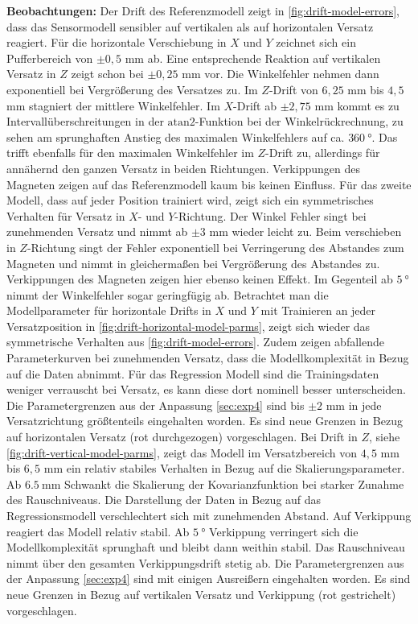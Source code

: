 \textbf{Beobachtungen:} Der Drift des Referenzmodell zeigt in \autoref{fig:drift-model-errors}, dass das Sensormodell sensibler auf vertikalen als auf horizontalen Versatz reagiert. Für die horizontale Verschiebung in $X$ und $Y$ zeichnet sich ein Pufferbereich von $\pm 0,5$ mm ab. Eine entsprechende Reaktion auf vertikalen Versatz in $Z$ zeigt schon bei $\pm 0,25$ mm vor. Die Winkelfehler nehmen dann exponentiell bei Vergrößerung des Versatzes zu. Im $Z$-Drift von $6,25$ mm bis $4,5$ mm stagniert der mittlere Winkelfehler. Im $X$-Drift ab $\pm 2,75$ mm kommt es zu Intervallüberschreitungen in der $\textrm{atan2}$-Funktion bei der Winkelrückrechnung, zu sehen am sprunghaften Anstieg des maximalen Winkelfehlers auf ca. $\SI{360}{\degree}$. Das trifft ebenfalls für den maximalen Winkelfehler im $Z$-Drift zu, allerdings für annähernd den ganzen Versatz in beiden Richtungen. Verkippungen des Magneten zeigen auf das Referenzmodell kaum bis keinen Einfluss.
\newline
Für das zweite Modell, dass auf jeder Position trainiert wird, zeigt sich ein symmetrisches Verhalten für Versatz in $X$- und $Y$-Richtung. Der Winkel Fehler singt bei zunehmenden Versatz und nimmt ab $\pm 3$ mm wieder leicht zu. Beim verschieben in $Z$-Richtung singt der Fehler exponentiell bei Verringerung des Abstandes zum Magneten und nimmt in gleichermaßen bei Vergrößerung des Abstandes zu. Verkippungen des Magneten zeigen hier ebenso keinen Effekt. Im Gegenteil ab $\SI{5}{\degree}$ nimmt der Winkelfehler sogar geringfügig ab.
\newline
Betrachtet man die Modellparameter für horizontale Drifts in $X$ und $Y$ mit Trainieren an jeder Versatzposition in \autoref{fig:drift-horizontal-model-parms}, zeigt sich wieder das symmetrische Verhalten aus \autoref{fig:drift-model-errors}. Zudem zeigen abfallende Parameterkurven bei zunehmenden Versatz, dass die Modellkomplexität in Bezug auf die Daten abnimmt. Für das Regression Modell sind die Trainingsdaten weniger verrauscht bei Versatz, es kann diese dort nominell besser unterscheiden. Die Parametergrenzen aus der Anpassung \autoref{sec:exp4} sind bis $\pm 2$ mm in jede Versatzrichtung größtenteils eingehalten worden. Es sind neue Grenzen in Bezug auf horizontalen Versatz (rot durchgezogen) vorgeschlagen.
\newline
Bei Drift in $Z$, siehe \autoref{fig:drift-vertical-model-parms}, zeigt das Modell im Versatzbereich von $4,5$ mm bis $6,5$ mm ein relativ stabiles Verhalten in Bezug auf die Skalierungsparameter. Ab $\SI{6,5}{\milli\metre}$ Schwankt die Skalierung der Kovarianzfunktion bei starker Zunahme des Rauschniveaus. Die Darstellung der Daten in Bezug auf das Regressionsmodell verschlechtert sich mit zunehmenden Abstand. Auf Verkippung reagiert das Modell relativ stabil. Ab $\SI{5}{\degree}$ Verkippung verringert sich die Modellkomplexität sprunghaft und bleibt dann weithin stabil. Das Rauschniveau nimmt über den gesamten Verkippungsdrift stetig ab. Die Parametergrenzen aus der Anpassung \autoref{sec:exp4} sind mit einigen Ausreißern eingehalten worden. Es sind neue Grenzen in Bezug auf vertikalen Versatz und Verkippung (rot gestrichelt) vorgeschlagen.


